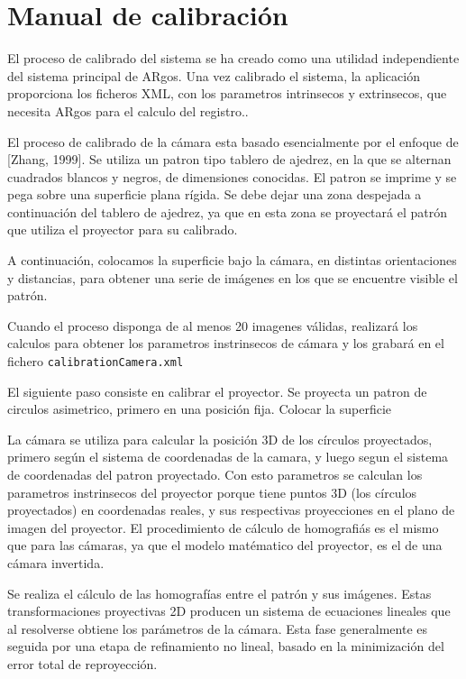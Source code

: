 \chapter{Manual de calibración}




El proceso de calibrado del sistema se ha creado como una utilidad independiente del sistema principal de ARgos. Una vez calibrado el sistema, la aplicación proporciona los ficheros XML, con los parametros intrinsecos y extrinsecos, que necesita ARgos para el calculo del registro..


El proceso de calibrado de la cámara esta basado esencialmente por el enfoque de [Zhang, 1999]. Se utiliza un patron tipo tablero de ajedrez, en la que se alternan cuadrados blancos y negros, de dimensiones conocidas. El patron se imprime y se pega sobre una superficie plana rígida. Se debe dejar una zona despejada a continuación del tablero de ajedrez, ya que en esta zona se proyectará el patrón que utiliza el proyector para su calibrado.  

A continuación, colocamos la superficie bajo la cámara, en distintas orientaciones y distancias, para obtener una serie de imágenes en los que se encuentre visible el patrón.

Cuando el proceso disponga de al menos 20 imagenes válidas, realizará los calculos para obtener los parametros instrinsecos de cámara y los grabará en el fichero \texttt{calibrationCamera.xml}

El siguiente paso consiste en calibrar el proyector. Se proyecta un patron de circulos asimetrico, primero en una posición fija. Colocar la superficie



 La cámara se utiliza para calcular la posición 3D de los círculos proyectados, primero según el sistema de coordenadas de la camara, y luego segun el sistema de coordenadas del patron proyectado. Con esto parametros se calculan los parametros instrinsecos del proyector porque tiene puntos 3D (los círculos proyectados) en coordenadas reales, y sus respectivas proyecciones en el plano de imagen del proyector. El procedimiento de cálculo de homografiás es el mismo que para las cámaras, ya que el modelo matématico del proyector, es el de una cámara invertida. 



Se realiza el cálculo de las homografías entre el patrón y sus imágenes. Estas transformaciones proyectivas 2D producen un sistema de ecuaciones lineales que al resolverse obtiene los parámetros de la cámara. Esta fase generalmente es seguida por una etapa de refinamiento no lineal, basado en la minimización del error total de reproyección.



